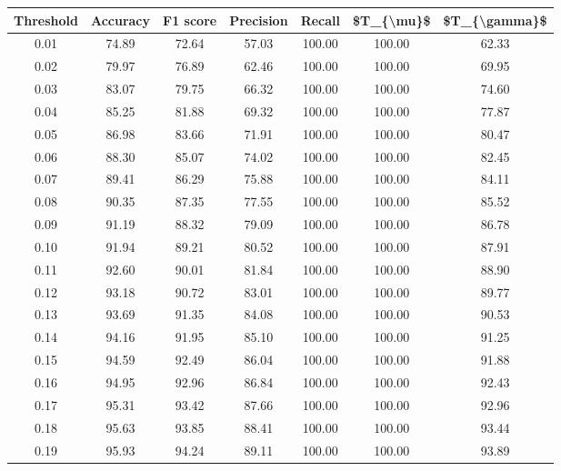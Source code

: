\begin{tabular}{|c|c|c|c|c|c|c|}
\hline
 Threshold &  Accuracy &  F1 score &  Precision &  Recall &  \$T\_\{\textbackslash mu\}\$ &  \$T\_\{\textbackslash gamma\}\$ \\
\hline
      0.01 &     74.89 &     72.64 &      57.03 &  100.00 &     100.00 &         62.33 \\
      0.02 &     79.97 &     76.89 &      62.46 &  100.00 &     100.00 &         69.95 \\
      0.03 &     83.07 &     79.75 &      66.32 &  100.00 &     100.00 &         74.60 \\
      0.04 &     85.25 &     81.88 &      69.32 &  100.00 &     100.00 &         77.87 \\
      0.05 &     86.98 &     83.66 &      71.91 &  100.00 &     100.00 &         80.47 \\
      0.06 &     88.30 &     85.07 &      74.02 &  100.00 &     100.00 &         82.45 \\
      0.07 &     89.41 &     86.29 &      75.88 &  100.00 &     100.00 &         84.11 \\
      0.08 &     90.35 &     87.35 &      77.55 &  100.00 &     100.00 &         85.52 \\
      0.09 &     91.19 &     88.32 &      79.09 &  100.00 &     100.00 &         86.78 \\
      0.10 &     91.94 &     89.21 &      80.52 &  100.00 &     100.00 &         87.91 \\
      0.11 &     92.60 &     90.01 &      81.84 &  100.00 &     100.00 &         88.90 \\
      0.12 &     93.18 &     90.72 &      83.01 &  100.00 &     100.00 &         89.77 \\
      0.13 &     93.69 &     91.35 &      84.08 &  100.00 &     100.00 &         90.53 \\
      0.14 &     94.16 &     91.95 &      85.10 &  100.00 &     100.00 &         91.25 \\
      0.15 &     94.59 &     92.49 &      86.04 &  100.00 &     100.00 &         91.88 \\
      0.16 &     94.95 &     92.96 &      86.84 &  100.00 &     100.00 &         92.43 \\
      0.17 &     95.31 &     93.42 &      87.66 &  100.00 &     100.00 &         92.96 \\
      0.18 &     95.63 &     93.85 &      88.41 &  100.00 &     100.00 &         93.44 \\
      0.19 &     95.93 &     94.24 &      89.11 &  100.00 &     100.00 &         93.89 \\

\end{tabular}
